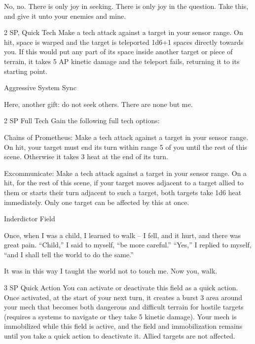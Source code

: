 No, no. There is only joy in seeking. There is only joy in the question. Take this, and give it unto your  
enemies and mine.  

2 SP, Quick Tech  
 Make a tech attack against a target in your sensor range. On hit, space is warped and the target  
is teleported 1d6+1 spaces directly towards you. If this would put any part of its space inside  
another target or piece of terrain, it takes 5 AP kinetic damage and the teleport fails, returning it  
to its starting point.
 

Aggressive System Sync  

Here, another gift: do not seek others. There are none but me.   

2 SP  
Full Tech  
Gain the following full tech options:
 
         Chains of Prometheus: Make a tech attack against a target in your sensor range. On hit,  
         your target must end its turn within range 5 of you until the rest of this scene. Otherwise it  
         takes 3 heat at the end of its turn.
 
         Excommunicate: Make a tech attack against a target in your sensor range. On a hit, for  
         the rest of this scene, if your target moves adjacent to a target allied to them or starts  
         their turn adjacent to such a target, both targets take 1d6 heat immediately. Only one  
         target can be affected by this at once.  

Inderdictor Field  

Once, when I was a child, I learned to walk  -- I fell, and it hurt, and there was great pain. “Child,” I said to  
myself, “be more careful.” “Yes,” I replied to myself, “and I shall tell the world to do the same.”  

It was in this way I taught the world not to touch me. Now you, walk.   

                                                                                                                  


3 SP  
Quick Action  
You can activate or deactivate this field as a quick action. Once activated, at the start of your  
next turn, it creates a burst 3 area around your mech that becomes both dangerous and difficult  
terrain for hostile targets (requires a systems to navigate or they take 5 kinetic damage). Your  
mech is immobilized while this field is active, and the field and immobilization remains until you  
take a quick action to deactivate it. Allied targets are not affected.
 

